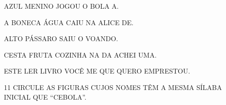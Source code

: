 \begin{escolha}
\item {\Large{AZUL MENINO JOGOU O BOLA A.}}\\

\item {\Large{A BONECA ÁGUA CAIU NA ALICE DE.}}\\

\item {\Large{ALTO PÁSSARO SAIU O VOANDO.}}\\

\item {\Large{CESTA FRUTA COZINHA NA DA ACHEI UMA.}}\\

\item {\Large{ESTE LER LIVRO VOCÊ ME QUE QUERO EMPRESTOU.}}\\
\end{escolha}

\pagebreak
\num{11} CIRCULE AS FIGURAS CUJOS NOMES TÊM
A MESMA SÍLABA INICIAL QUE ``CEBOLA''.



